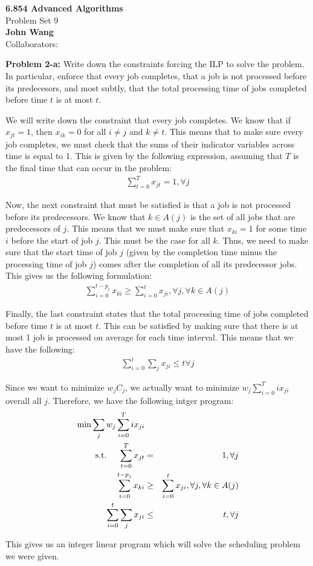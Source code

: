 \documentclass[psamsfonts]{amsart}
\newenvironment{sol}{\vspace{0.25cm}{\large \bfseries Solution:}}{\qedsymbol}
\newenvironment{prob}[1]{\begin{framed}{\large \bfseries Problem #1:}}{\end{framed}}
\newcommand{\makenewtitle}{
    \begin{center}
    {\huge \bfseries 6.854 Advanced Algorithms} \\
    Problem Set 9\\
    \vspace{0.25cm}
    {\bfseries John Wang} \\
    Collaborators:  
    \end{center}
    \vspace{0.5cm}
}
\begin{document}
\newpage
\makenewtitle

\begin{prob}{2-a}
Write down the constraints forcing the ILP to solve the problem. In particular, enforce that every job completes, that a job is not processed before its predecesors, and most subtly, that the total processing time of jobs completed before time $t$ is at most $t$. 
\end{prob}

\begin{sol}
We will write down the constraint that every job completes. We know that if $x_{jt} = 1$, then $x_{ik} = 0$ for all $i \neq j$ and $k \neq t$. This means that to make sure every job completes, we must check that the sums of their indicator variables across time is equal to 1. This is given by the following expression, assuming that $T$ is the final time that can occur in the problem:
\begin{eqnarray}
\sum_{t=0}^T x_{jt} = 1, \forall j
\end{eqnarray}

Now, the next constraint that must be satisfied is that a job is not processed before its predecessors. We know that $k \in A(j)$ is the set of all jobs that are predecessors of $j$. This means that we must make sure that $x_{ki} = 1$ for some time $i$ before the start of job $j$. This must be the case for all $k$. Thus, we need to make sure that the start time of job $j$ (given by the completion time minus the processing time of job $j$) comes after the completion of all its predecessor jobs. This gives us the following formulation:
\begin{eqnarray}
\sum_{i=0}^{t - p_j} x_{ki} \geq \sum_{i=0}^t x_{ji}, \forall j, \forall k \in A(j)
\end{eqnarray}

Finally, the last constraint states that the total processing time of jobs completed before time $t$ is at most $t$. This can be satisfied by making sure that there is at most 1 job is processed on average for each time interval. This means that we have the following:
\begin{eqnarray}
\sum_{i=0}^t \sum_{j} x_{ji} \leq t \forall j
\end{eqnarray}

Since we want to minimize $w_j C_j$, we actually want to minimize $w_{j} \sum_{i=0}^{T} i x_{ji}$ overall all $j$. Therefore, we have the following intger program:
\begin{eqnarray}
\min \sum_{j} w_{j} \sum_{i=0}^T i x_{ji} \\
\text{s.t.} \hspace{0.5cm} \sum_{t=0}^T x_{jt} &=& 1, \forall j \\
\sum_{i=0}^{t - p_j} x_{ki} &\geq& \sum_{i=0}^t x_{ji}, \forall j, \forall k \in A(j) \\
\sum_{i=0}^t \sum_{j} x_{ji} &\leq& t, \forall j
\end{eqnarray}

This gives us an integer linear program which will solve the scheduling problem we were given.
\end{sol}
\end{document}
